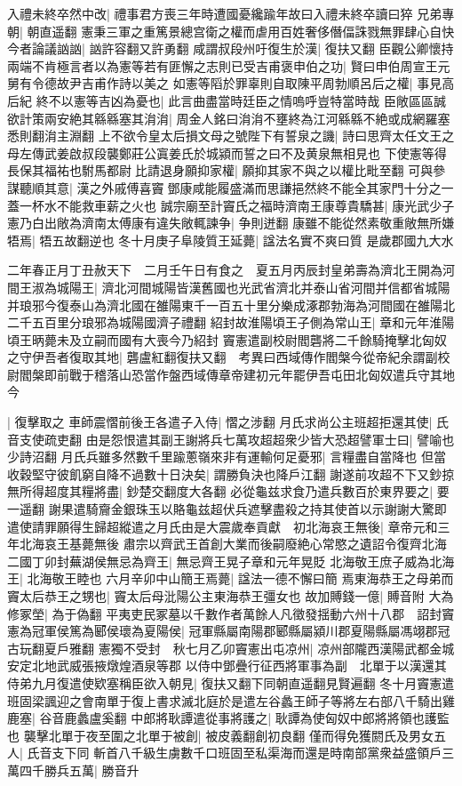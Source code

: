 入禮未終卒然中改|{
	禮事君方喪三年時遭國憂纔踰年故曰入禮未終卒讀曰猝}
兄弟專朝|{
	朝直遥翻}
憲秉三軍之重篤景總宫衛之權而虐用百姓奢侈僭偪誅戮無罪肆心自快今者論議訩訩|{
	訩許容翻又許勇翻}
咸謂叔段州吁復生於漢|{
	復扶又翻}
臣觀公卿懷持兩端不肯極言者以為憲等若有匪懈之志則已受吉甫褒申伯之功|{
	賢曰申伯周宣王元舅有令德故尹吉甫作詩以美之}
如憲等䧟於罪辜則自取陳平周勃順呂后之權|{
	事見高后紀}
終不以憲等吉凶為憂也|{
	此言曲盡當時廷臣之情嗚呼豈特當時哉}
臣敞區區誠欲計策兩安絶其緜緜塞其㳙㳙|{
	周金人銘曰㳙㳙不壅終為江河緜緜不絶或成網羅塞悉則翻㳙主淵翻}
上不欲令皇太后損文母之號陛下有誓泉之譏|{
	詩曰思齊太任文王之母左傳武姜啟叔段襲鄭莊公寘姜氏於城潁而誓之曰不及黄泉無相見也}
下使憲等得長保其福祐也駙馬都尉比請退身願抑家權|{
	願抑其家不與之以權比毗至翻}
可與參謀聽順其意|{
	漢之外戚傅喜竇鄧康咸能履盛滿而思謙挹然終不能全其家門十分之一蓋一杯水不能救車薪之火也}
誠宗廟至計竇氏之福時濟南王康尊貴驕甚|{
	康光武少子}
憲乃白出敞為濟南太傅康有違失敞輒諫争|{
	争則迸翻}
康雖不能從然素敬重敞無所嫌牾焉|{
	牾五故翻逆也}
冬十月庚子阜陵質王延薨|{
	諡法名實不爽曰質}
是歲郡國九大水

二年春正月丁丑赦天下　二月壬午日有食之　夏五月丙辰封皇弟壽為濟北王開為河間王淑為城陽王|{
	濟北河間城陽皆漢舊國也光武省濟北并泰山省河間并信都省城陽并琅邪今復泰山為濟北國在雒陽東千一百五十里分樂成涿郡勃海為河間國在雒陽北二千五百里分琅邪為城陽國濟子禮翻}
紹封故淮陽頃王子側為常山王|{
	章和元年淮陽頃王昞薨未及立嗣而國有大喪今乃紹封}
竇憲遣副校尉閻礱將二千餘騎掩擊北匈奴之守伊吾者復取其地|{
	礱盧紅翻復扶又翻　考異曰西域傳作閻槃今從帝紀余謂副校尉閻槃即前戰于稽落山恐當作盤西域傳章帝建初元年罷伊吾屯田北匈奴遣兵守其地今}


|{
	復擊取之}
車師震慴前後王各遣子入侍|{
	慴之涉翻}
月氏求尚公主班超拒還其使|{
	氏音支使疏吏翻}
由是怨恨遣其副王謝將兵七萬攻超超衆少皆大恐超譬軍士曰|{
	譬喻也少詩沼翻}
月氏兵雖多然數千里踰蔥嶺來非有運輸何足憂邪|{
	言糧盡自當降也}
但當收穀堅守彼飢窮自降不過數十日決矣|{
	謂勝負決也降戶江翻}
謝遂前攻超不下又鈔掠無所得超度其糧將盡|{
	鈔楚交翻度大各翻}
必從龜兹求食乃遣兵數百於東界要之|{
	要一遥翻}
謝果遣騎齎金銀珠玉以賂龜兹超伏兵遮擊盡殺之持其使首以示謝謝大驚即遣使請罪願得生歸超縱遣之月氏由是大震歲奉貢獻　初北海哀王無後|{
	章帝元和三年北海哀王基薨無後}
肅宗以齊武王首創大業而後嗣廢絶心常愍之遺詔令復齊北海二國丁卯封蕪湖侯無忌為齊王|{
	無忌齊王晃子章和元年晃貶}
北海敬王庶子威為北海王|{
	北海敬王睦也}
六月辛卯中山簡王焉薨|{
	諡法一德不懈曰簡}
焉東海恭王之母弟而竇太后恭王之甥也|{
	竇太后母沘陽公主東海恭王彊女也}
故加賻錢一億|{
	賻音附}
大為修冢塋|{
	為于偽翻}
平夷吏民冢墓以千數作者萬餘人凡徵發揺動六州十八郡　詔封竇憲為冠軍侯篤為郾侯瓌為夏陽侯|{
	冠軍縣屬南陽郡郾縣屬潁川郡夏陽縣屬馮翊郡冠古玩翻夏戶雅翻}
憲獨不受封　秋七月乙卯竇憲出屯凉州|{
	凉州部隴西漢陽武都金城安定北地武威張掖燉煌酒泉等郡}
以侍中鄧疊行征西將軍事為副　北單于以漢還其侍弟九月復遣使欵塞稱臣欲入朝見|{
	復扶又翻下同朝直遥翻見賢遍翻}
冬十月竇憲遣班固梁諷迎之會南單于復上書求滅北庭於是遣左谷蠡王師子等將左右部八千騎出雞鹿塞|{
	谷音鹿蠡盧奚翻}
中郎將耿譚遣從事將護之|{
	耿譚為使匈奴中郎將將領也護監也}
襲擊北單于夜至圍之北單于被創|{
	被皮義翻創初良翻}
僅而得免獲閼氏及男女五人|{
	氏音支下同}
斬首八千級生虜數千口班固至私渠海而還是時南部黨衆益盛領戶三萬四千勝兵五萬|{
	勝音升}


